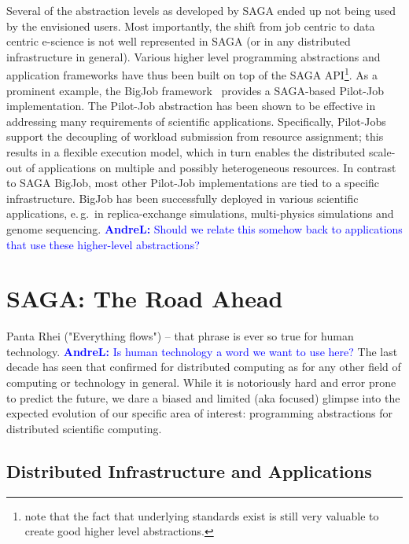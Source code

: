 \documentclass[]{article}
\newcommand{\B}[1]{\textbf{#1}}
\newcommand{\alnote}[1]{{\textcolor{blue}{    \B{AndreL:  } #1 }}}
\newcommand{\alnote}[1]{}
\begin{document}
  Several of the abstraction levels as developed by SAGA ended up not
  being used by the envisioned users.  Most importantly, the shift
  from job centric to data centric e-science is not well represented
  in SAGA (or in any distributed infrastructure in general).  Various
  higher level programming abstractions and application frameworks
  have thus been built on top of the SAGA API\footnote{note that the
  fact that underlying standards exist is still very valuable to
  create good higher level abstractions.}.  As a prominent example,
  the BigJob framework~\cite{saga_bigjob_condor_cloud}  provides a
  SAGA-based Pilot-Job implementation. The Pilot-Job abstraction has
  been shown to be effective in addressing many requirements of
  scientific applications.  Specifically, Pilot-Jobs support the
  decoupling of workload submission from resource assignment; this
  results in a flexible execution model, which in turn enables the
  distributed scale-out of applications on multiple and possibly
  heterogeneous resources. In contrast to SAGA BigJob, most other
  Pilot-Job implementations are tied to a specific infrastructure.
  BigJob has been successfully deployed in various scientific
  applications, e.\,g.\ in replica-exchange simulations, multi-physics
  simulations and genome sequencing.
\alnote{Should we relate this somehow back to applications that use these
higher-level abstractions?	}

\section{SAGA: The Road Ahead}
\label{sec:road}

 Panta Rhei ("Everything flows") -- that phrase is ever so true for
 human technology.\alnote{Is human technology a word we want to use here?}  
 The last decade has seen that confirmed for
 distributed computing as for any other field of computing or
 technology in general.  While it is notoriously hard and error prone
 to predict the future, we dare a biased and limited (aka focused)
 glimpse into the expected evolution of our specific area of interest:
 programming abstractions for distributed scientific computing. 


\subsection{Distributed Infrastructure and Applications}


\end{document}
